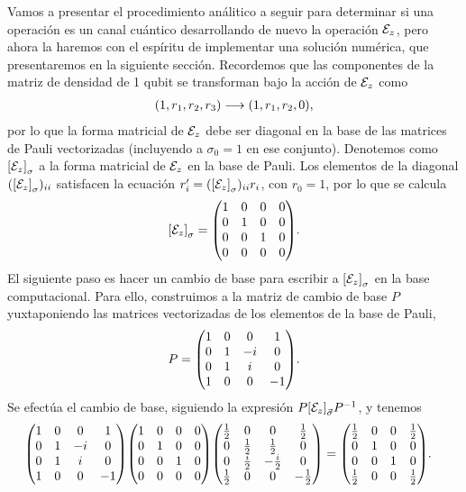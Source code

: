 Vamos a presentar el procedimiento análitico a seguir para 
determinar si una operación es un canal cuántico desarrollando
de nuevo la operación $\mathcal{E}_z$, pero ahora la haremos con 
el espíritu de implementar una solución numérica, 
que presentaremos en la siguiente sección.
Recordemos que las componentes de la matriz de densidad
de 1 qubit  se transforman bajo la acción de $\mathcal{E}_z$ como
\begin{align}
\qty(1,r_1,r_2,r_3)\longrightarrow\qty(1,r_1,r_2,0),
\end{align}
por lo que la forma matricial de $\mathcal{E}_z$ debe ser diagonal 
en la base de las matrices de Pauli vectorizadas (incluyendo
a $\sigma_0=1$ en ese conjunto).
Denotemos como $\qty[\mathcal{E}_z]_{\sigma}$ a la forma matricial de
$\mathcal{E}_z$ en la base de Pauli. 
Los elementos de la diagonal $(\qty[\mathcal{E}_{z}]_{\sigma})_{ii}$ 
satisfacen la ecuación $r_i'=(\qty[\mathcal{E}_{z}]_{\sigma})_{ii}r_i$, 
con $r_0=1$, por lo que se calcula
\begin{align}
\qty[\E_z]_{\sigma}=
\mqty(
 1 & 0 & 0 & 0 \\
 0 & 1 & 0 & 0 \\
 0 & 0 & 1 & 0 \\
 0 & 0 & 0 & 0 
).
\end{align}
El siguiente paso es hacer un cambio de base para escribir
a $\qty[\mathcal{E}_z]_{\sigma}$ en la base computacional.
Para ello, construimos a la matriz de cambio de base $P$
yuxtaponiendo las matrices vectorizadas de los elementos
de la base de Pauli,
\begin{align}
P=\mqty(
 1 & 0 & 0 & 1 \\
 0 & 1 & -i & 0 \\
 0 & 1 & i & 0 \\
 1 & 0 & 0 & -1 
).
\end{align}
Se efectúa el cambio de base, siguiendo la expresión 
$P\qty[\mathcal{E}_z]_{\vec{\sigma}}P^{-1}$, y tenemos
\begin{align}
\mqty(
 1 & 0 & 0 & 1 \\
 0 & 1 & -i & 0 \\
 0 & 1 & i & 0 \\
 1 & 0 & 0 & -1 
)
\mqty(
 1 & 0 & 0 & 0 \\
 0 & 1 & 0 & 0 \\
 0 & 0 & 1 & 0 \\
 0 & 0 & 0 & 0 
)
\mqty(
 \frac{1}{2} & 0 & 0 & \frac{1}{2} \\
 0 & \frac{1}{2} & \frac{1}{2} & 0 \\
 0 & \frac{i}{2} & -\frac{i}{2} & 0 \\
 \frac{1}{2} & 0 & 0 & -\frac{1}{2} 
)
&=
\mqty(
 \frac{1}{2} & 0 & 0 & \frac{1}{2} \\
 0 & 1 & 0 & 0 \\
 0 & 0 & 1 & 0 \\
 \frac{1}{2} & 0 & 0 & \frac{1}{2} 
).
\end{align}
